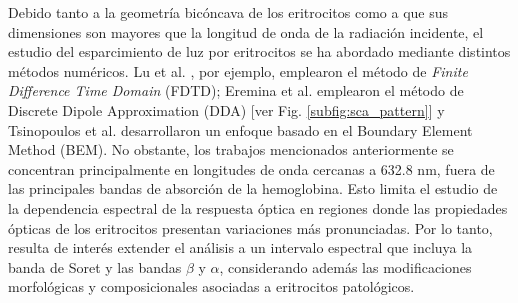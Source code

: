  Debido tanto a la geometría bicóncava de los eritrocitos como a que sus dimensiones son mayores que la longitud de onda de la radiación incidente, el estudio del esparcimiento de luz por eritrocitos se ha abordado mediante distintos métodos numéricos. Lu et al. \cite{luSimulationsLightScattering2005}, por ejemplo, emplearon el método de \textit{Finite Difference Time Domain} (FDTD); Eremina et al. \cite{ereminaDifferentShapeModels2006} emplearon el método de Discrete Dipole
Approximation (DDA) [ver Fig. \ref{subfig:sca_pattern}] y Tsinopoulos et al. \cite{tsinopoulosLightScatteringAggregated2002} desarrollaron un enfoque basado en el Boundary Element Method (BEM). No obstante, los trabajos mencionados anteriormente se concentran principalmente en longitudes de onda cercanas a 632.8 nm, fuera de las principales bandas de absorción de la hemoglobina. Esto limita el estudio de la dependencia espectral de la respuesta óptica en regiones donde las propiedades ópticas de los eritrocitos presentan variaciones más pronunciadas. Por lo tanto, resulta de interés extender el análisis a un intervalo espectral que incluya la banda de Soret y las bandas $\beta$ y $\alpha$, considerando además las modificaciones morfológicas y composicionales asociadas a eritrocitos patológicos.

%

%
%

